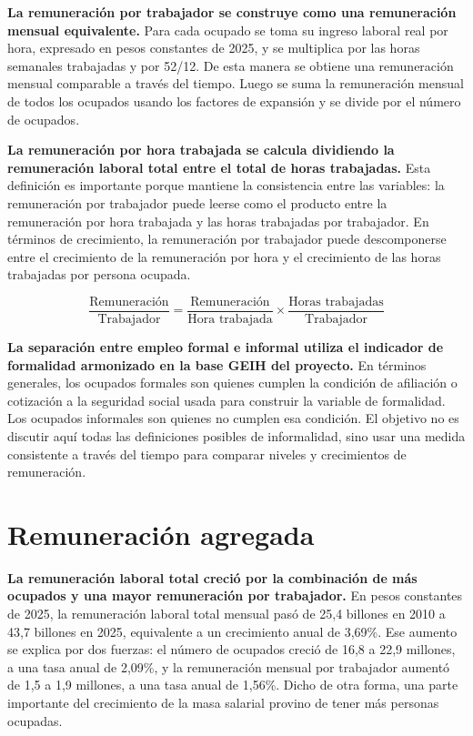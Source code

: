 \textbf{La remuneración por trabajador se construye como una remuneración mensual equivalente.} Para cada ocupado se toma su ingreso laboral real por hora, expresado en pesos constantes de 2025, y se multiplica por las horas semanales trabajadas y por 52/12. De esta manera se obtiene una remuneración mensual comparable a través del tiempo. Luego se suma la remuneración mensual de todos los ocupados usando los factores de expansión y se divide por el número de ocupados.

\textbf{La remuneración por hora trabajada se calcula dividiendo la remuneración laboral total entre el total de horas trabajadas.} Esta definición es importante porque mantiene la consistencia entre las variables: la remuneración por trabajador puede leerse como el producto entre la remuneración por hora trabajada y las horas trabajadas por trabajador. En términos de crecimiento, la remuneración por trabajador puede descomponerse entre el crecimiento de la remuneración por hora y el crecimiento de las horas trabajadas por persona ocupada.

\[
\frac{\text{Remuneración}}{\text{Trabajador}}
=
\frac{\text{Remuneración}}{\text{Hora trabajada}}
\times
\frac{\text{Horas trabajadas}}{\text{Trabajador}}
\]

\textbf{La separación entre empleo formal e informal utiliza el indicador de formalidad armonizado en la base GEIH del proyecto.} En términos generales, los ocupados formales son quienes cumplen la condición de afiliación o cotización a la seguridad social usada para construir la variable de formalidad. Los ocupados informales son quienes no cumplen esa condición. El objetivo no es discutir aquí todas las definiciones posibles de informalidad, sino usar una medida consistente a través del tiempo para comparar niveles y crecimientos de remuneración.

\section{Remuneración agregada}



\textbf{La remuneración laboral total creció por la combinación de más ocupados y una mayor remuneración por trabajador.} En pesos constantes de 2025, la remuneración laboral total mensual pasó de 25,4 billones en 2010 a 43,7 billones en 2025, equivalente a un crecimiento anual de 3,69\%. Ese aumento se explica por dos fuerzas: el número de ocupados creció de 16,8 a 22,9 millones, a una tasa anual de 2,09\%, y la remuneración mensual por trabajador aumentó de 1,5 a 1,9 millones, a una tasa anual de 1,56\%. Dicho de otra forma, una parte importante del crecimiento de la masa salarial provino de tener más personas ocupadas.

